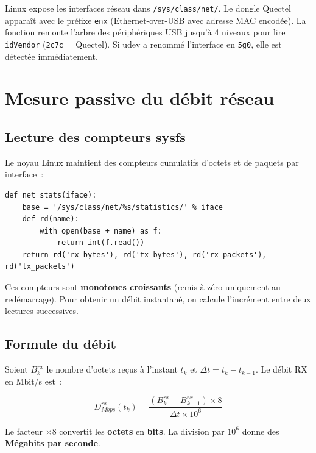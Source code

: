 \documentclass[a4paper,12pt]{article}
\begin{document}
Linux expose les interfaces réseau dans \texttt{/sys/class/net/}. Le dongle Quectel
apparaît avec le préfixe \texttt{enx} (Ethernet-over-USB avec adresse MAC encodée). La
fonction remonte l'arbre des périphériques USB jusqu'à 4 niveaux pour lire
\texttt{idVendor} (\texttt{2c7c} = Quectel). Si udev a renommé l'interface en
\texttt{5g0}, elle est détectée immédiatement.

\section{Mesure passive du débit réseau}

\subsection{Lecture des compteurs sysfs}

Le noyau Linux maintient des compteurs cumulatifs d'octets et de paquets par interface~:

\begin{lstlisting}[caption={Lecture des compteurs noyau}]
def net_stats(iface):
    base = '/sys/class/net/%s/statistics/' % iface
    def rd(name):
        with open(base + name) as f:
            return int(f.read())
    return rd('rx_bytes'), rd('tx_bytes'), rd('rx_packets'), rd('tx_packets')
\end{lstlisting}

Ces compteurs sont \textbf{monotones croissants} (remis à zéro uniquement au redémarrage).
Pour obtenir un débit instantané, on calcule l'incrément entre deux lectures successives.

\subsection{Formule du débit}

Soient $B^{rx}_k$ le nombre d'octets reçus à l'instant $t_k$ et $\Delta t = t_k - t_{k-1}$.
Le débit RX en Mbit/s est~:

\begin{equation}
  \boxed{D^{rx}_{Mbps}(t_k) = \frac{(B^{rx}_k - B^{rx}_{k-1}) \times 8}{\Delta t \times 10^6}}
\end{equation}

Le facteur $\times 8$ convertit les \textbf{octets} en \textbf{bits}.
La division par $10^6$ donne des \textbf{Mégabits par seconde}.
\end{document}
